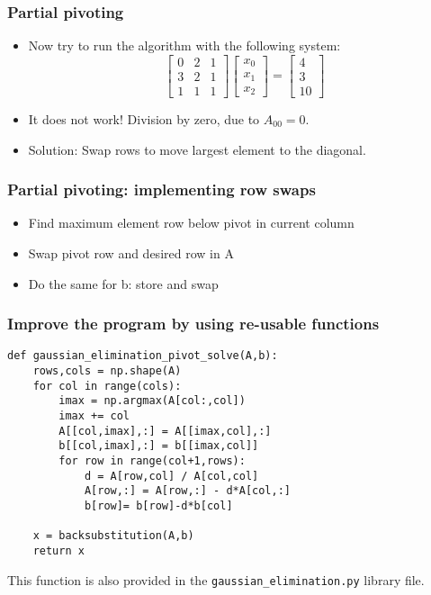 \begin{frame}[fragile]
  \frametitle{Partial pivoting}
  \begin{itemize}
    \item Now try to run the algorithm with the following system:
    \[
    \begin{bmatrix}
      0 & 2 & 1\\ 
      3 & 2 & 1 \\ 
      1 & 1 & 1
    \end{bmatrix}
    \begin{bmatrix}x_0\\x_1\\x_2\end{bmatrix} = 
    \begin{bmatrix}4\\3\\10\end{bmatrix}
  \]
  \pause
  \item It does not work! Division by zero, due to $A_{00}=0$.
  \item Solution: Swap rows to move largest element to the diagonal.
  \end{itemize}
\end{frame}

\begin{frame}[fragile]
  \frametitle{Partial pivoting: implementing row swaps}
  \begin{itemize}
    \item<1->  Find maximum element row below pivot in current column
    \item<2-> Swap pivot row and desired row in A
    \item<3-> Do the same for b: store and swap
  \end{itemize}

\end{frame}

\begin{frame}[fragile]
  \frametitle{Improve the program by using re-usable functions}
  \begin{lstlisting}
def gaussian_elimination_pivot_solve(A,b):
    rows,cols = np.shape(A)
    for col in range(cols):
        imax = np.argmax(A[col:,col])
        imax += col
        A[[col,imax],:] = A[[imax,col],:]
        b[[col,imax],:] = b[[imax,col]]
        for row in range(col+1,rows):
            d = A[row,col] / A[col,col]
            A[row,:] = A[row,:] - d*A[col,:]
            b[row]= b[row]-d*b[col]
    
    x = backsubstitution(A,b)
    return x 
  \end{lstlisting}
  This function is also provided in the \lstinline$gaussian_elimination.py$ library file.
\end{frame}

